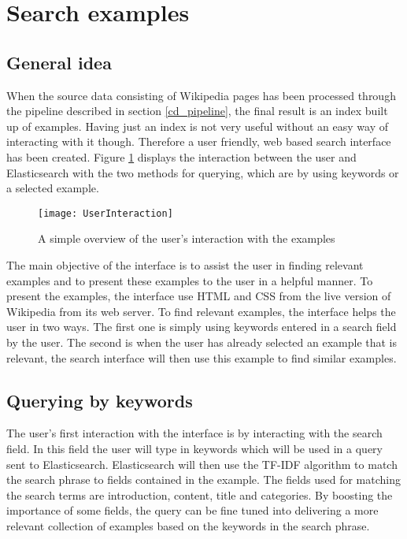 \section{Search examples}

\subsection{General idea}
When the source data consisting of Wikipedia pages has been processed through the pipeline described in section \ref{cd_pipeline}, the final result is an index built up of examples. Having just an index is not very useful without an easy way of interacting with it though. Therefore a user friendly, web based search interface has been created. Figure \ref{fig:ui} displays the interaction between the user and Elasticsearch with the two methods for querying, which are by using keywords or a selected example.

\begin{figure}[h]
\caption{A simple overview of the user's interaction with the examples}
\texttt{[image: UserInteraction]}
\label{fig:ui}
\end{figure}

The main objective of the interface is to assist the user in finding relevant examples and to present these examples to the user in a helpful manner. To present the examples, the interface use HTML and CSS from the live version of Wikipedia from its web server. To find relevant examples, the interface helps the user in two ways. The first one is simply using keywords entered in a search field by the user. The second is when the user has already selected an example that is relevant, the search interface will then use this example to find similar examples.

\subsection{Querying by keywords}

The user's first interaction with the interface is by interacting with the search field. In this field the user will type in keywords which will be used in a query sent to Elasticsearch. Elasticsearch will then use the TF-IDF algorithm to match the search phrase to fields contained in the example. The fields used for matching the search terms are introduction, content, title and categories. By boosting the importance of some fields, the query can be fine tuned into delivering a more relevant collection of examples based on the keywords in the search phrase.


